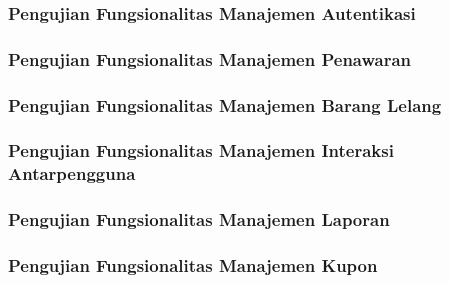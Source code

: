 		
	\subsubsection{Pengujian Fungsionalitas Manajemen Autentikasi}	
	
%	
		
	\subsubsection{Pengujian Fungsionalitas Manajemen Penawaran}
	
		
	\subsubsection{Pengujian Fungsionalitas Manajemen Barang Lelang}
	
			
	\subsubsection{Pengujian Fungsionalitas Manajemen Interaksi Antarpengguna}
	
	
	\subsubsection{Pengujian Fungsionalitas Manajemen Laporan}
	
	
	\subsubsection{Pengujian Fungsionalitas Manajemen Kupon}
	
	
			

	
